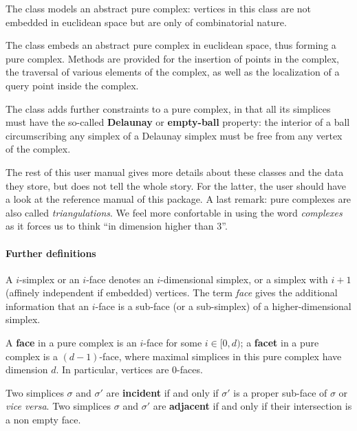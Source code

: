 {The class  models an abstract pure complex: vertices in this
class are not embedded in euclidean space but are only of combinatorial
nature.

The class  embeds an abstract
pure complex in euclidean space, thus forming a pure complex. Methods are
provided for the insertion %
of points in the complex, the
traversal of various elements of the complex, as well as the localization of a
query point inside the complex.

The class  adds further
constraints to a pure complex, in that all its simplices must have the
so-called \textbf{Delaunay} or \textbf{empty-ball} property: the interior of
a ball circumscribing any simplex of a Delaunay simplex must be free from any
vertex of the complex.


The rest of this user manual gives more details about these classes and the
data they store, but does not tell the whole story. For the latter, the user
should have a look at the reference manual of this package. A last remark:
pure complexes are also called \emph{triangulations}. We feel more confortable
in using the word \emph{complexes} as it forces us to think ``in dimension
higher than 3''.

\paragraph{Further definitions}

A $i$-simplex or an $i$-face denotes an $i$-dimensional simplex, or a simplex
with $i+1$ (affinely independent if embedded) vertices. The term \emph{face}
gives the additional information that an $i$-face is a sub-face (or a
sub-simplex) of a higher-dimensional simplex.

A \textbf{face} in a pure complex is an $i$-face for some $i\in[0,d)$;
a \textbf{facet} in a pure complex is a $(d-1)$-face, where maximal simplices
in this pure complex have dimension $d$. In particular, vertices are
$0$-faces.

Two simplices $\sigma$ and $\sigma'$ are \textbf{incident} if and only if
$\sigma'$ is a proper sub-face of $\sigma$ or \emph{vice versa}.
Two simplices $\sigma$ and $\sigma'$ are \textbf{adjacent} if and only if
their intersection is a non empty face.

}
